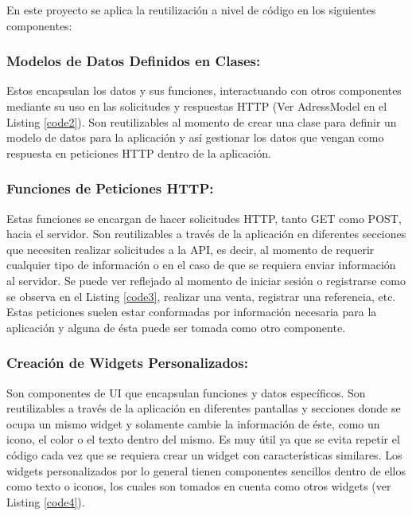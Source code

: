 \documentclass[runningheads]{llncs}
\begin{document}
                En este proyecto se aplica la reutilización a nivel de código en los siguientes componentes:

            \subsubsection*{Modelos de Datos Definidos en Clases:}
                Estos encapsulan los datos y sus funciones, interactuando con otros componentes mediante su uso en las solicitudes y respuestas HTTP (Ver AdressModel en el Listing \ref{code2}). Son reutilizables al momento de crear una clase para definir un modelo de datos para la aplicación y así gestionar los datos que vengan como respuesta en peticiones HTTP dentro de la aplicación.
                

            \subsubsection*{Funciones de Peticiones HTTP:}
                Estas funciones se encargan de hacer solicitudes HTTP, tanto GET como POST, hacia el servidor. Son reutilizables a través de la aplicación en diferentes secciones que necesiten realizar solicitudes a la API, es decir, al momento de requerir cualquier tipo de información o en el caso de que se requiera enviar información al servidor. Se puede ver reflejado al momento de iniciar sesión o registrarse como se observa en el Listing \ref{code3}, realizar una venta, registrar una referencia, etc. Estas peticiones suelen estar conformadas por información necesaria para la aplicación y alguna de ésta puede ser tomada como otro componente.
                

            \subsubsection*{Creación de Widgets Personalizados:}
                Son componentes de UI que encapsulan funciones y datos específicos. Son reutilizables a través de la aplicación en diferentes pantallas y secciones donde se ocupa un mismo widget y solamente cambie la información de éste, como un icono, el color o el texto dentro del mismo. Es muy útil ya que se evita repetir el código cada vez que se requiera crear un widget con características similares. Los widgets personalizados por lo general tienen componentes sencillos dentro de ellos como texto o iconos, los cuales son tomados en cuenta como otros widgets (ver Listing \ref{code4}).
                
\end{document}

